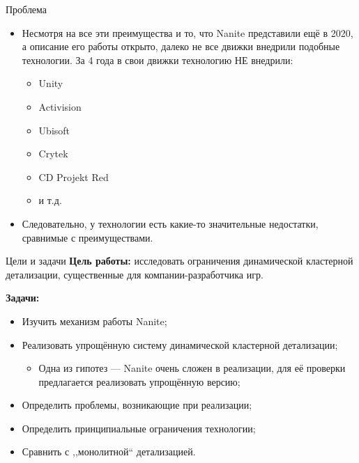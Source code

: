 \documentclass{beamer}
\begin{document}
    \begin{frame}{Проблема}
        \begin{itemize}
            \item Несмотря на все эти преимущества и то, что Nanite представили ещё в 2020, а описание его работы открыто, далеко не все движки внедрили подобные технологии. За 4 года в свои движки технологию НЕ внедрили:
            \begin{itemize}
                \item Unity
                \item Activision
                \item Ubisoft
                \item Crytek
                \item CD Projekt Red
                \item и т.д.
            \end{itemize}
            \item Следовательно, у технологии есть какие-то значительные недостатки, сравнимые с преимуществами.
        \end{itemize}
    \end{frame}

    \begin{frame}{Цели и задачи}
        \textbf{Цель работы:}
        исследовать ограничения динамической кластерной детализации,
        существенные для компании-разработчика игр.

        \bigskip

        \textbf{Задачи:}
        \begin{itemize}
            \item Изучить механизм работы Nanite;
            \item Реализовать упрощённую систему
            динамической кластерной детализации;
            \begin{itemize}
                \item Одна из гипотез --- Nanite
                очень сложен в реализации,
                для её проверки предлагается реализовать
                упрощённую версию;
            \end{itemize}
            \item Определить проблемы, возникающие при реализации;
            \item Определить принципиальные ограничения технологии;
            \item Сравнить с ,,монолитной`` детализацией.
        \end{itemize}
    \end{frame}
\end{document}
